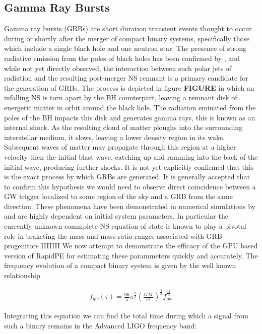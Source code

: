 \subsection{Gamma Ray Bursts}
Gamma ray bursts (GRBs) are short duration transient events thought to occur during or shortly after the merger of compact binary systems, specifically those which include a single black hole and one neutron star. The presence of strong radiative emission from the poles of black holes has been confirmed by \cite{polarjet}, and while not yet directly observed, the interaction between such polar jets of radiation and the resulting post-merger NS remnant is a primary candidate for the generation of GRBs. The process is depicted in figure \textbf{FIGURE} in which an infalling NS is torn apart by the BH counterpart, leaving a remnant disk of energetic matter in orbit around the black hole. The radiation eminated from the poles of the BH impacts this disk and generates gamma rays, this is known as an internal shock. As the resulting cloud of matter ploughs into the surrounding interstellar medium, it slows, leaving a lower density region in its wake. Subsequent waves of matter may propagate through this region at a higher velocity then the initial blast wave, catching up and ramming into the back of the initial wave, producing further shocks.
It is not yet explicitly confirmed that this is the exact process by which GRBs are generated. It is generally accepted that to confirm this hypothesis we would need to observe direct coincidence between a GW trigger localized to some region of the sky and a GRB from the same direction. These phenomena have been demonstrated in numerical simulations by \cite{kilonova} and are highly dependent on initial system parameters. In particular the currently unknown commplete NS equation of state is known to play a pivotal role in braketing the mass and mass ratio ranges associated with GRB progenitors IIIIIII We now attempt to demonstrate the efficacy of the GPU based version of RapidPE for estimating these parammeters quickly and accurately. The frequency evolution of a compact binary system is given by the well known relationship

\begin{align}
\dot{f_{gw}}(\tau) = \frac{96}{5}\pi^{\frac{8}{3}} \left(\frac{G \mathcal{M}}{c^3}\right)^{\frac{5}{3}}f_{gw}^{\frac{11}{3}}
\end{align}

Integrating this equation we can find the total time during which a signal from such a binary remains in the Advanced LIGO frequency band:

